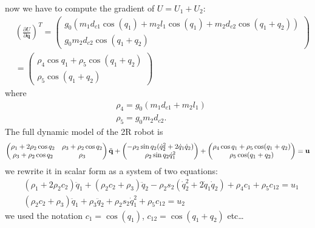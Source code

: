 \documentclass[10pt, a4paper]{report}
\newcommand{\q}{{\mathbf q}}
\begin{document}
now we have to compute the gradient of $U=U_1+U_2$:\begin{align}
    &\left(\frac{\partial U}{\partial \q}\right)^T=\begin{pmatrix} g_0(m_1 d_{c1} \cos(q_1)+ m_2 l_1 \cos(q_1) + m_2 d_{c2} \cos(q_1+q_2)) \\ g_0 m_2 d_{c2} \cos(q_1+q_2) \end{pmatrix}\\ & =\begin{pmatrix}
    \rho_4\cos q_1+\rho_5 \cos (q_1+q_2)\\ \rho_5 \cos (q_1+q_2)
    \end{pmatrix}\end{align}where\begin{align} 
    &\rho_4=g_0(m_1 d_{c1}+ m_2 l_1)\\ 
    &\rho_5= g_0 m_2 d_{c2}.
\end{align}
The full dynamic model of the 2R robot is\begin{equation}
    \begin{pmatrix}
        \rho_1 + 2\rho_2 \cos q_2&\rho_3+\rho_2\cos q_2\\ 
        \rho_3+\rho_2\cos q_2&\rho_3
    \end{pmatrix}{\ddot{\mathbf q}}+\begin{pmatrix}
        -\rho_2\sin q_2(\dot q_2^2+2\dot q_1\dot q_2)\\ 
        \rho_2\sin q_2\dot q_1^2
    \end{pmatrix}+\begin{pmatrix}
    \rho_4\cos q_1+\rho_5 \cos (q_1+q_2)\\ \rho_5 \cos (q_1+q_2)
    \end{pmatrix}=\mathbf u
\end{equation}
we rewrite it in scalar form as a system of two equations:\begin{align}
&(\rho_1 + 2\rho_2 c_2)\ddot{q}_1 + (\rho_2 c_2 + \rho_3)\ddot{q}_2 - \rho_2 s_2(\dot{q}_2^2 + 2\dot{q}_1 \dot{q}_2)
+ \rho_4 c_1 + \rho_5 c_{12} = u_1 \\
&(\rho_2 c_2 + \rho_3)\ddot{q}_1 + \rho_3 \ddot{q}_2 + \rho_2 s_2 \dot{q}_1^2 + \rho_5 c_{12} = u_2
\end{align}
we used the notation $c_1=\cos(q_1)$, $c_{12}=\cos(q_1+q_2)$ etc\dots
\end{document}

